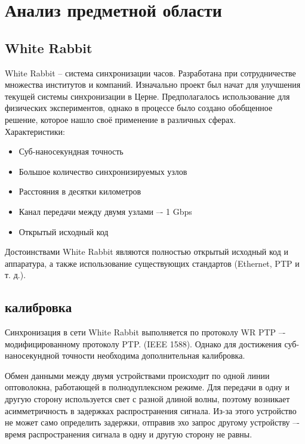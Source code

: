 \chapter{Анализ предметной области} \label{ch1}

\section{White Rabbit} \label{ch1:sec1}

White Rabbit -- система синхронизации часов. Разработана при сотрудничестве множества
институтов и компаний. Изначально проект был начат для улучшения текущей системы синхронизации в Церне.
Предполагалось использование для физических экспериментов, однако в процессе было создано обобщенное решение,
которое нашло своё применение в различных сферах.\\

\noindent Характеристики:

\begin{itemize}
	\item Суб-наносекундная точность
	\item Большое количество синхронизируемых узлов
	\item Расстояния в десятки километров
	\item Канал передачи между двумя узлами –- 1 Gbps
	\item Открытый исходный код\\
\end{itemize}

Достоинствами White Rabbit являются полностью открытый исходный код и аппаратура, а также 
использование существующих стандартов (Ethernet, PTP и т. д.).

\section{калибровка}

Синхронизация в сети White Rabbit выполняется по протоколу WR PTP –- модифицированному протоколу PTP. (IEEE 1588).
Однако для достижения суб-наносекундной точности необходима дополнительная калибровка.

Обмен данными между двумя устройствами происходит по одной линии оптоволокна, работающей в полнодуплексном режиме.
Для передачи в одну и другую сторону используется свет с разной длиной волны, поэтому возникает асимметричность в
задержках распространения сигнала. Из-за этого устройство не может само определить задержки, отправив эхо запрос
другому устройству –- время распространения сигнала в одну и другую сторону не равны.

